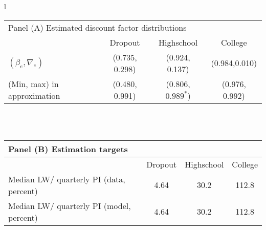 \documentclass[\econtexRoot/HAFiscal]{subfiles}
\begin{document}
\begin{table}[tp]
  \begin{center}
    \begin{tabular}{l}
      \begin{tabular}{lccc}
        \multicolumn{4}{l}{Panel (A) Estimated discount factor distributions} \\ 
        & Dropout & Highschool & College \\ \midrule
        $(\beta_e, \nabla_e)$ & (0.735, 0.298) & (0.924, 0.137) & (0.984,0.010) \\
        (Min, max) in approximation & (0.480, 0.991) & (0.806, $0.989^*$) & (0.976, 0.992) \\
        \midrule 
      \end{tabular} \\ \\ 
      
      \begin{tabular}{lccc}
        \multicolumn{4}{l}{Panel (B) Estimation targets} \\ \midrule
        & Dropout & Highschool & College \\ \midrule
        Median LW/ quarterly PI (data, percent) & 4.64 & 30.2 & 112.8 \\ 
        Median LW/ quarterly PI (model, percent) & 4.64 & 30.2 & 112.8 %
        \\ \midrule 
      \end{tabular} \\ \\ 
      

\end{tabular}
\end{center}
\end{table}
\end{document}
